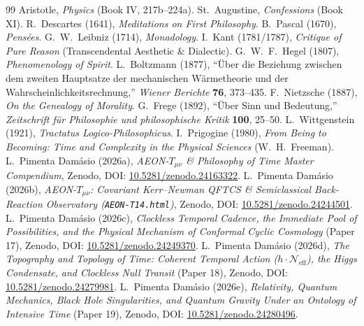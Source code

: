 \documentclass[11pt,a4paper]{article}
\begin{document}
\begin{thebibliography}{99}
 Aristotle, \emph{Physics} (Book IV, 217b--224a).
 St.~Augustine, \emph{Confessions} (Book XI).
 R.~Descartes (1641), \emph{Meditations on First Philosophy}.
 B.~Pascal (1670), \emph{Pens\'ees}.
 G.~W.~Leibniz (1714), \emph{Monadology}.
 I.~Kant (1781/1787), \emph{Critique of Pure Reason} (Transcendental Aesthetic \& Dialectic).
 G.~W.~F.~Hegel (1807), \emph{Phenomenology of Spirit}.
 L.~Boltzmann (1877), ``\"Uber die Beziehung zwischen dem zweiten Hauptsatze der mechanischen W\"armetheorie und der Wahrscheinlichkeitsrechnung,'' \emph{Wiener Berichte} \textbf{76}, 373--435.
 F.~Nietzsche (1887), \emph{On the Genealogy of Morality}.
 G.~Frege (1892), ``\"Uber Sinn und Bedeutung,'' \emph{Zeitschrift f\"ur Philosophie und philosophische Kritik} \textbf{100}, 25--50.
 L.~Wittgenstein (1921), \emph{Tractatus Logico-Philosophicus}.
 I.~Prigogine (1980), \emph{From Being to Becoming: Time and Complexity in the Physical Sciences} (W.~H.~Freeman).
 L.~Pimenta Dam\'asio (2026a), \emph{\textsc{AEON}-$T_{\mu\nu}$ \& Philosophy of Time Master Compendium}, Zenodo, DOI: \href{https://doi.org}{10.5281/zenodo.24163322}.
 L.~Pimenta Dam\'asio (2026b), \emph{\textsc{AEON}-$T_{\mu\nu}$: Covariant Kerr--Newman QFTCS \& Semiclassical Back-Reaction Observatory (\texttt{AEON-T14.html})}, Zenodo, DOI: \href{https://doi.org}{10.5281/zenodo.24244501}.
 L.~Pimenta Dam\'asio (2026c), \emph{Clockless Temporal Cadence, the Immediate Pool of Possibilities, and the Physical Mechanism of Conformal Cyclic Cosmology} (Paper 17), Zenodo, DOI: \href{https://doi.org}{10.5281/zenodo.24249370}.
 L.~Pimenta Dam\'asio (2026d), \emph{The Topography and Topology of Time: Coherent Temporal Action ($h \cdot \mathcal{N}_{\text{eff}}$), the Higgs Condensate, and Clockless Null Transit} (Paper 18), Zenodo, DOI: \href{https://doi.org}{10.5281/zenodo.24279981}.
 L.~Pimenta Dam\'asio (2026e), \emph{Relativity, Quantum Mechanics, Black Hole Singularities, and Quantum Gravity Under an Ontology of Intensive Time} (Paper 19), Zenodo, DOI: \href{https://doi.org}{10.5281/zenodo.24280496}.
\end{thebibliography}
\end{document}
